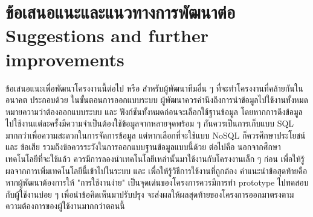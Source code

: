 \section{\ifcpe%
ข้อเสนอแนะและแนวทางการพัฒนาต่อ
\else%
Suggestions and further improvements
\fi
}



ข้อเสนอแนะเพื่อพัฒนาโครงงานนี้ต่อไป หรือ สำหรับผู้พัฒนาทีมอื่น ๆ ที่จะทำโครงงานที่คล้ายกันในอนาคต ประกอบด้วย 
ในขั้นตอนการออกแบบระบบ ผู้พัฒนาควรคำนึงถึงการนำข้อมูลไปใช้งานทั้งหมด หมายความว่าต้องออกแบบระบบ และ ฟังก์ชันทั้งหมดก่อนจะเลือกใช้ฐานข้อมูล 
โดยหากการดึงข้อมูลไปใช้งานแต่ละครั้งมีความจำเป็นต้องใช้ข้อมูลจากหลายจุดพร้อม ๆ กันควรเป็นการเก็บแบบ SQL มากกว่าเพื่อความสะดวกในการจัดการข้อมูล 
แต่หากเลือกที่จะใช้แบบ NoSQL ก็ควรศึกษาประโยชน์ และ ข้อเสีย รวมถึงข้อควรระวังในการออกแบบฐานข้อมูลแบบนี้ด้วย 
ต่อไปคือ นอกจากศึกษาเทคโนโลยีที่จะใช้แล้ว ควรมีการลองนำเทคโนโลยีเหล่านั้นมาใช้งานกับโครงงานเล็ก ๆ ก่อน เพื่อให้รู้ผลจากการเพิ่มเทคโนโลยีนี้เข้าไปในระบบ และ เพื่อให้รู้วิธีการใช้งานที่ถูกต้อง 
คำแนะนำข้อสุดท้ายคือ หากผู้พัฒนาต้องการให้ "การใช้งานง่าย" เป็นจุดเด่นของโครงการควรมีการทำ prototype ไปทดสอบกับผู้ใช้งานบ่อย ๆ เพื่อนำข้อคิดเห็นมาปรับปรุง จะส่งผลให้ผลสุดท้ายของโครงการออกมาตรงตามความต้องการของผู้ใช้งานมากกว่าตอนนี้
